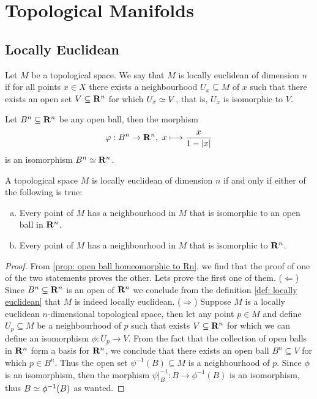 \section{Topological Manifolds}

\subsection{Locally Euclidean}

\begin{definition}\label{def: locally euclidean}
    Let \(M\) be a topological space. We say that \(M \) is locally euclidean of
    dimension \(n\) if for all points \(x \in X\) there exists a neighbourhood
    \(U_x \subseteq M\) of \(x\) such that there exists an open set \(V \subseteq
    \mathbf{R}^n\) for which \(U_x \simeq V\), that is, \(U_x\) is isomorphic to
    \(V\).
\end{definition}

\begin{proposition}\label{prop: open ball homeomorphic to Rn}
    Let \(B^n \subseteq \mathbf{R}^n\) be any open ball, then the morphism
    \[
        \varphi: B^n \to \mathbf{R}^n,\ x \longmapsto \frac{x}{1 - |x|}
    \]
    is an isomorphism \(B^n \simeq \mathbf{R}^n\).
\end{proposition}

\begin{lemma}\label{lem:locally-euclidean-equivalences}
    A topological space \(M\) is locally euclidean of dimension \(n\) if and only
    if either of the following is true:
    \begin{enumerate}[(a)]
        \item Every point of \(M\) has a neighbourhood in \(M\) that is isomorphic
              to an open ball in \(\mathbf{R}^n\).
        \item Every point of \(M\) has a neighbourhood in \(M\) that is isomorphic
              to \(\mathbf{R}^n\).
    \end{enumerate}
\end{lemma}

\begin{proof}
    From \cref{prop: open ball homeomorphic to Rn}, we find that the proof of one
    of the two statements proves the other. Lets prove the first one of them.
    (\(\Leftarrow\)) Since \(B^n \subseteq \mathbf{R}^n\) is an open of
    \(\mathbf{R}^n\) we conclude from the definition \cref{def: locally euclidean}
    that \(M\) is indeed locally euclidean.
    (\(\Rightarrow\)) Suppose \(M\) is a locally euclidean \(n\)-dimensional
    topological space, then let any point \(p \in M\) and define \(U_p \subseteq
    M\) be a neighbourhood of \(p\) such that exists \(V \subseteq \mathbf{R}^n\)
    for which we can define an isomorphism \(\phi : U_p \to V\). From the fact
    that the collection of open balls in \(\mathbf{R}^n\) form a basis for
    \(\mathbf{R}^n\), we conclude that there exists an open ball \(B^n \subseteq
    V\) for which \(p \in B^n\). Thus the open set \(\psi^{-1}(B) \subseteq M\) is
    a neighbourhood of \(p\). Since \(\phi\) is an isomorphism, then the
    morphism \(\psi|_B^{-1} : B \to \phi^{-1}(B)\) is an isomorphism, thus \(B
    \simeq \phi^{-1}(B)\) as wanted.
\end{proof}

